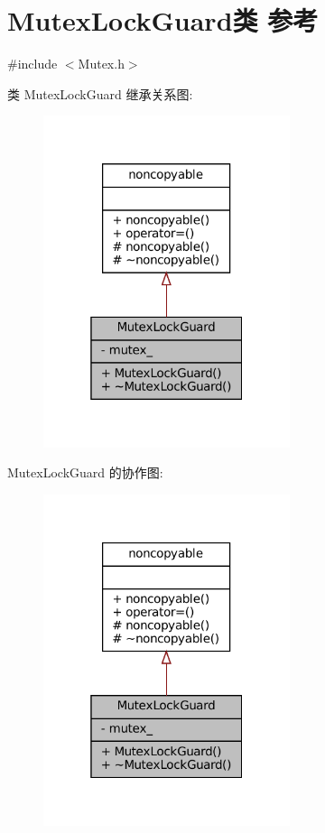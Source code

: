 \hypertarget{classmuduo_1_1MutexLockGuard}{}\section{Mutex\+Lock\+Guard类 参考}
\label{classmuduo_1_1MutexLockGuard}


{\ttfamily \#include $<$Mutex.\+h$>$}



类 Mutex\+Lock\+Guard 继承关系图\+:
\nopagebreak
\begin{figure}[H]
\begin{center}
\leavevmode
\includegraphics[width=205pt]{classmuduo_1_1MutexLockGuard__inherit__graph}
\end{center}
\end{figure}


Mutex\+Lock\+Guard 的协作图\+:
\nopagebreak
\begin{figure}[H]
\begin{center}
\leavevmode
\includegraphics[width=205pt]{classmuduo_1_1MutexLockGuard__coll__graph}
\end{center}
\end{figure}
